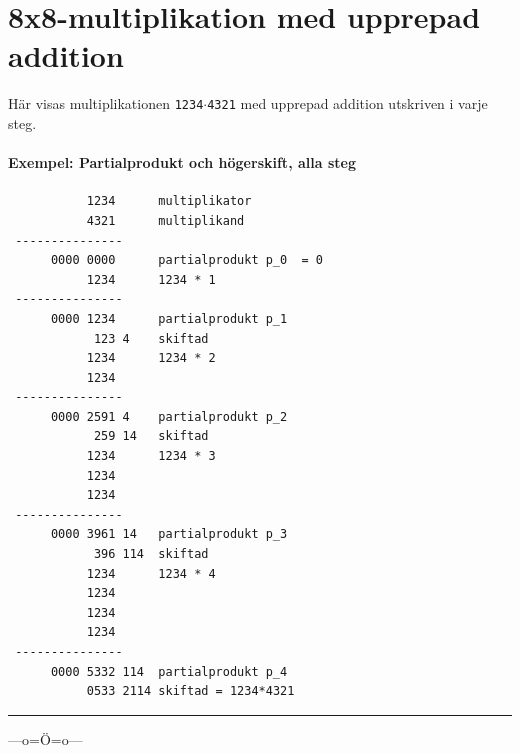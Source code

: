\documentclass[oneside,10pt,a4paper,swedish]{scrbook}
\newcommand{\startex}[1]{\subsubsection{Exempel: #1}}
\newcommand{\slutex}{\vspace{-8mm}\begin{flushright} \rule{1ex}{1ex} \end{flushright}}
\newcommand{\asm}[1]{\texttt{#1}}
\begin{document}
\chapter{8x8-multiplikation med upprepad addition}
Här visas multiplikationen \asm{1234}$\cdot$\asm{4321} med upprepad addition utskriven i varje steg.
\startex{Partialprodukt och högerskift, alla steg}
\begin{center}
\begin{lstlisting}
           1234	     multiplikator
           4321      multiplikand
 ---------------
      0000 0000      partialprodukt p_0  = 0
           1234      1234 * 1
 ---------------
      0000 1234      partialprodukt p_1
            123 4    skiftad      
           1234      1234 * 2
           1234      
 ---------------
      0000 2591 4    partialprodukt p_2
            259 14   skiftad
           1234      1234 * 3
           1234
           1234
 ---------------     
      0000 3961 14   partialprodukt p_3
            396 114  skiftad
           1234      1234 * 4
           1234
           1234
           1234
 ---------------
      0000 5332 114  partialprodukt p_4 
           0533 2114 skiftad = 1234*4321
\end{lstlisting}
\end{center}
\slutex
\begin{center}---o=Ö=o---\end{center}
\end{document}
